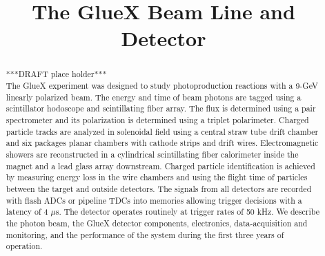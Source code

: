 \documentclass{elsarticle}
\begin{document}
  


  
\begin{frontmatter} 


\title{The GlueX Beam Line and Detector}





\begin{abstract}
***DRAFT place holder***\\
The GlueX experiment was designed to study photoproduction reactions with a 9-GeV linearly polarized beam. The energy and time of beam photons are tagged using a scintillator
hodoscope and scintillating fiber array. The flux is determined using a pair spectrometer and its polarization is determined using a triplet polarimeter. 
Charged particle tracks are analyzed in solenoidal field using a central straw tube
drift chamber and six packages planar chambers with cathode strips and drift wires. Electromagnetic showers are reconstructed in a cylindrical scintillating fiber calorimeter inside the magnet and
a lead glass array downstream. Charged particle identification is achieved by measuring energy loss in the wire chambers and using the flight time of particles between the target and outside 
detectors. The signals from all detectors are recorded with flash ADCs or pipeline TDCs into memories allowing trigger decisions with a latency of 4 $\mu$s. The detector operates routinely at
trigger rates of 50 kHz. We describe the photon beam, the GlueX detector components, electronics, data-acquisition and monitoring, and the performance of the system during the first three 
years of operation.
\end{abstract}   


\end{frontmatter}

  
   

\end{document}
